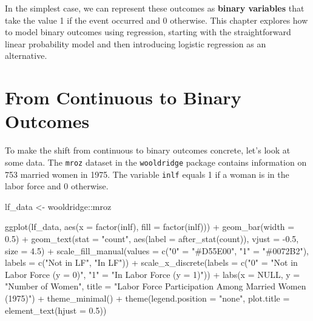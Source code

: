 \documentclass[
  letterpaper,
  DIV=11,
  numbers=noendperiod]{scrreprt}
\newenvironment{Shaded}{\begin{snugshade}}{\end{snugshade}}
\newcommand{\AttributeTok}[1]{\textcolor[rgb]{0.40,0.45,0.13}{#1}}
\newcommand{\ConstantTok}[1]{\textcolor[rgb]{0.56,0.35,0.01}{#1}}
\newcommand{\FloatTok}[1]{\textcolor[rgb]{0.68,0.00,0.00}{#1}}
\newcommand{\FunctionTok}[1]{\textcolor[rgb]{0.28,0.35,0.67}{#1}}
\newcommand{\NormalTok}[1]{\textcolor[rgb]{0.00,0.23,0.31}{#1}}
\newcommand{\OtherTok}[1]{\textcolor[rgb]{0.00,0.23,0.31}{#1}}
\newcommand{\SpecialCharTok}[1]{\textcolor[rgb]{0.37,0.37,0.37}{#1}}
\newcommand{\StringTok}[1]{\textcolor[rgb]{0.13,0.47,0.30}{#1}}
\newcounter{none} %
\begin{document}
In the simplest case, we can represent these outcomes as \textbf{binary
variables} that take the value 1 if the event occurred and 0 otherwise.
This chapter explores how to model binary outcomes using regression,
starting with the straightforward linear probability model and then
introducing logistic regression as an alternative.

\section{From Continuous to Binary
Outcomes}\label{from-continuous-to-binary-outcomes}

To make the shift from continuous to binary outcomes concrete, let's
look at some data. The \texttt{mroz} dataset in the \texttt{wooldridge}
package contains information on 753 married women in 1975. The variable
\texttt{inlf} equals 1 if a woman is in the labor force and 0 otherwise.

\begin{Shaded}
\begin{Highlighting}[]
\NormalTok{lf\_data }\OtherTok{\textless{}{-}}\NormalTok{ wooldridge}\SpecialCharTok{::}\NormalTok{mroz}

\FunctionTok{ggplot}\NormalTok{(lf\_data, }\FunctionTok{aes}\NormalTok{(}\AttributeTok{x =} \FunctionTok{factor}\NormalTok{(inlf), }\AttributeTok{fill =} \FunctionTok{factor}\NormalTok{(inlf))) }\SpecialCharTok{+}
    \FunctionTok{geom\_bar}\NormalTok{(}\AttributeTok{width =} \FloatTok{0.5}\NormalTok{) }\SpecialCharTok{+}
    \FunctionTok{geom\_text}\NormalTok{(}\AttributeTok{stat =} \StringTok{"count"}\NormalTok{, }\FunctionTok{aes}\NormalTok{(}\AttributeTok{label =} \FunctionTok{after\_stat}\NormalTok{(count)), }\AttributeTok{vjust =} \SpecialCharTok{{-}}\FloatTok{0.5}\NormalTok{, }\AttributeTok{size =} \FloatTok{4.5}\NormalTok{) }\SpecialCharTok{+}
    \FunctionTok{scale\_fill\_manual}\NormalTok{(}\AttributeTok{values =} \FunctionTok{c}\NormalTok{(}\StringTok{"0"} \OtherTok{=} \StringTok{"\#D55E00"}\NormalTok{, }\StringTok{"1"} \OtherTok{=} \StringTok{"\#0072B2"}\NormalTok{),}
                      \AttributeTok{labels =} \FunctionTok{c}\NormalTok{(}\StringTok{"Not in LF"}\NormalTok{, }\StringTok{"In LF"}\NormalTok{)) }\SpecialCharTok{+}
    \FunctionTok{scale\_x\_discrete}\NormalTok{(}\AttributeTok{labels =} \FunctionTok{c}\NormalTok{(}\StringTok{"0"} \OtherTok{=} \StringTok{"Not in Labor Force (y = 0)"}\NormalTok{,}
                                \StringTok{"1"} \OtherTok{=} \StringTok{"In Labor Force (y = 1)"}\NormalTok{)) }\SpecialCharTok{+}
    \FunctionTok{labs}\NormalTok{(}\AttributeTok{x =} \ConstantTok{NULL}\NormalTok{,}
         \AttributeTok{y =} \StringTok{"Number of Women"}\NormalTok{,}
         \AttributeTok{title =} \StringTok{"Labor Force Participation Among Married Women (1975)"}\NormalTok{) }\SpecialCharTok{+}
    \FunctionTok{theme\_minimal}\NormalTok{() }\SpecialCharTok{+}
    \FunctionTok{theme}\NormalTok{(}\AttributeTok{legend.position =} \StringTok{"none"}\NormalTok{,}
          \AttributeTok{plot.title =} \FunctionTok{element\_text}\NormalTok{(}\AttributeTok{hjust =} \FloatTok{0.5}\NormalTok{))}
\end{Highlighting}
\end{Shaded}
\end{document}
